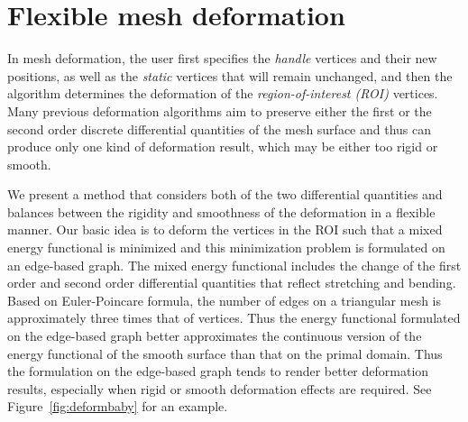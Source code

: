 \section{Flexible mesh deformation} \label{ch5:sec:alg:flexdefo}
In  mesh deformation, the user first  specifies the \textit{handle}
vertices and their new positions, as well as the \textit{static}
vertices that will remain unchanged, and then the algorithm
determines the deformation of the \textit{region-of-interest (ROI)}
vertices. Many previous deformation algorithms aim to preserve
either the first or the second order discrete differential
quantities of the mesh surface and thus can produce only one kind of
deformation result, which may be either too rigid or smooth.

We present  a method that considers both of the two differential
quantities and balances between the rigidity and smoothness of the
deformation in a flexible manner. Our basic idea is to deform the
vertices in the ROI such that a mixed energy functional is minimized
and this minimization problem is formulated on an edge-based graph.
The mixed energy functional includes the change of the first order
and second order differential quantities that reflect stretching and
bending. Based on Euler-Poincare formula, the number of edges on a
triangular mesh is approximately three times that of vertices. Thus
the energy functional formulated on the edge-based graph better
approximates the continuous version of the energy functional of the
smooth surface than that on the primal domain. Thus the formulation
on the edge-based graph tends to render better deformation results,
especially when rigid or smooth deformation effects are required.
See Figure~\ref{fig:deformbaby} for an example.

